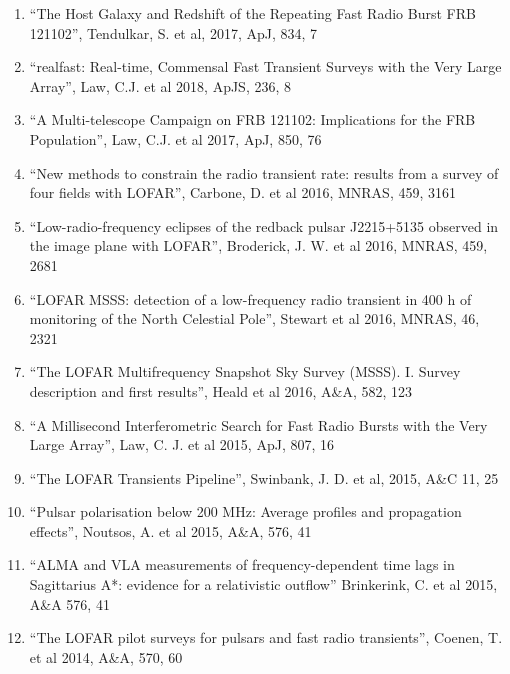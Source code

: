 \documentclass[11pt]{article}
\begin{document}
\begin{enumerate}
    \item ``The Host Galaxy and Redshift of the Repeating Fast Radio Burst FRB 121102'', Tendulkar, S. et al, 2017, ApJ, 834, 7

    \item ``realfast: Real-time, Commensal Fast Transient Surveys with the Very Large Array'', Law, C.J. et al 2018, ApJS, 236, 8

    \item ``A Multi-telescope Campaign on FRB 121102: Implications for the FRB Population'', Law, C.J. et al 2017, ApJ, 850, 76

    \item ``New methods to constrain the radio transient rate: results from a survey of four fields with LOFAR'', Carbone, D. et al 2016, MNRAS, 459, 3161

    \item ``Low-radio-frequency eclipses of the redback pulsar J2215+5135 observed in the image plane with LOFAR'', Broderick, J. W. et al 2016, MNRAS, 459, 2681

    \item ``LOFAR MSSS: detection of a low-frequency radio transient in 400 h of monitoring of the North Celestial Pole'', Stewart et al 2016, MNRAS, 46, 2321

    \item ``The LOFAR Multifrequency Snapshot Sky Survey (MSSS). I. Survey description and first results'', Heald et al 2016, A\&A, 582, 123

    \item ``A Millisecond Interferometric Search for Fast Radio Bursts with the Very Large Array'', Law, C. J. et al 2015, ApJ, 807, 16

    \item ``The LOFAR Transients Pipeline'', Swinbank, J. D. et al, 2015, A\&C 11, 25

    \item ``Pulsar polarisation below 200 MHz: Average profiles and propagation effects'', Noutsos, A. et al 2015, A\&A, 576, 41

    \item ``ALMA and VLA measurements of frequency-dependent time lags in Sagittarius A*: evidence for a relativistic outflow'' Brinkerink, C. et al 2015, A\&A 576, 41

    \item ``The LOFAR pilot surveys for pulsars and fast radio transients'', Coenen, T. et al 2014, A\&A, 570, 60


\end{enumerate}
\end{document}
